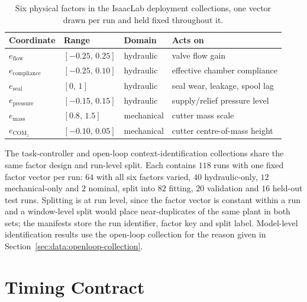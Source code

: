 \begin{table}[H]
  \centering
  \caption{Six physical factors in the IsaacLab deployment collections, one
  vector drawn per run and held fixed throughout it.}
  \label{tab:data:factors}
  \small
  \begin{tabular}{llll}
    \toprule
    Coordinate & Range & Domain & Acts on \\
    \midrule
    $e_{\mathrm{flow}}$       & $[-0.25,\, 0.25]$ & hydraulic  & valve flow gain \\
    $e_{\mathrm{compliance}}$ & $[-0.25,\, 0.10]$ & hydraulic  & effective chamber compliance \\
    $e_{\mathrm{seal}}$       & $[0,\, 1]$        & hydraulic  & seal wear, leakage, spool lag \\
    $e_{\mathrm{pressure}}$   & $[-0.15,\, 0.15]$ & hydraulic  & supply/relief pressure level \\
    $e_{\mathrm{mass}}$       & $[0.8,\, 1.5]$    & mechanical & cutter mass scale \\
    $e_{\mathrm{COM}_z}$      & $[-0.10,\, 0.05]$ & mechanical & cutter centre-of-mass height \\
    \bottomrule
  \end{tabular}
\end{table}

\label{app:data:frozen}
The task-controller and open-loop context-identification collections share the
same factor design and run-level split. Each contains $118$ runs with one fixed
factor vector per run: $64$ with all six factors varied, $40$ hydraulic-only,
$12$ mechanical-only and $2$ nominal, split into $82$ fitting, $20$ validation
and $16$ held-out test runs. Splitting is at run level, since the factor vector
is constant within a run and a window-level split would place near-duplicates of
the same plant in both sets; the manifests store the run identifier, factor key
and split label. Model-level identification results use the open-loop
collection for the reason given in
Section~\ref{sec:data:openloop-collection}.

\section{Timing Contract}

